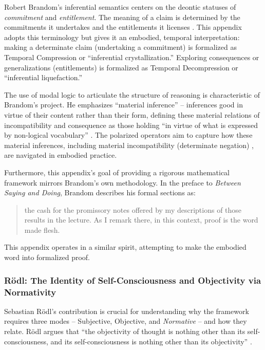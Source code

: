 \documentclass[12pt]{book}
\begin{document}
Robert Brandom's inferential semantics centers on the deontic statuses of \textit{commitment} and \textit{entitlement}. The meaning of a claim is determined by the commitments it undertakes and the entitlements it licenses \parencite{brandom1994making, Brandom2000}. This appendix adopts this terminology but gives it an embodied, temporal interpretation: making a determinate claim (undertaking a commitment) is formalized as Temporal Compression or ``inferential crystallization.'' Exploring consequences or generalizations (entitlements) is formalized as Temporal Decompression or ``inferential liquefaction.''

The use of modal logic to articulate the structure of reasoning is characteristic of Brandom's project. He emphasizes ``material inference'' -- inferences good in virtue of their content rather than their form, defining these material relations of incompatibility and consequence as those holding ``in virtue of what is expressed by non-logical vocabulary'' \parencite[Note 9]{brandom_reason_2013}. The polarized operators aim to capture how these material inferences, including material incompatibility (determinate negation) \parencite{Brandom:2019aa}, are navigated in embodied practice.

Furthermore, this appendix's goal of providing a rigorous mathematical framework mirrors Brandom's own methodology. In the preface to \textit{Between Saying and Doing}, Brandom describes his formal sections as:
\begin{quote}
the cash for the promissory notes offered by my descriptions of those results in the lecture. As I remark there, in this context, proof is the word made flesh. \parencite[p. xix]{Brandom2008}
\end{quote}
This appendix operates in a similar spirit, attempting to make the embodied word into formalized proof.

\subsubsection{Rödl: The Identity of Self-Consciousness and Objectivity via Normativity}

Sebastian Rödl's contribution is crucial for understanding why the framework requires three modes -- Subjective, Objective, and \textit{Normative} -- and how they relate. Rödl argues that ``the objectivity of thought is nothing other than its self-consciousness, and its self-consciousness is nothing other than its objectivity'' \parencite[11]{Rodl:2018aa}.
\end{document}
